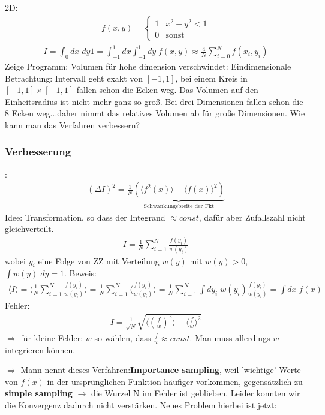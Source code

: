 \documentclass[12pt]{article}
\begin{document}
2D: %
\begin{align}
f(x,y)=
\begin{cases}
1 & x^2+y^2 <1 \\
0 & \mbox{sonst}
\end{cases}
\end{align}
\begin{align}
I= \int_0 dx \; dy 1 = \int_{-1}^1 dx \int_{-1}^1 dy \; f(x,y) 
\approx \frac{4}{N} \sum_{i=0}^N f(x_i,y_i)
\end{align}
Zeige Programm: Volumen für hohe dimension verschwindet: Eindimensionale Betrachtung: Intervall geht exakt von $[-1,1]$, bei einem Kreis in $[-1,1] \times [-1,1]$ fallen schon die Ecken weg. Das Volumen auf den Einheitsradius ist nicht mehr ganz so groß. Bei drei Dimensionen fallen schon die 8 Ecken weg...daher nimmt das relatives Volumen ab für große Dimensionen.
Wie kann man das Verfahren verbessern?

\subsubsection{Verbesserung}:
\begin{align}
(\Delta I )^2 = \frac{1}{N} \underbrace{\left( \langle f^2(x) \rangle - \langle f(x)\rangle^2 \right)}_\text{Schwankungsbreite der Fkt}
\end{align}
Idee: Transformation, so dass der Integrand $\approx const$, dafür aber Zufallszahl nicht gleichverteilt.
\begin{align}
I= \frac{1}{N} \sum_{i=1}^N \frac{f(y_i)}{w(y_i)}
\end{align}
wobei $y_i$ eine Folge von ZZ mit Verteilung $w(y)$ mit $w(y)>0$, $\int w(y) \; dy=1$.
Beweis:
\begin{align}
\langle I\rangle = \langle \frac{1}{N} \sum_{i=1}^N \frac{f(y_i)}{w(y_i)} \rangle = \frac{1}{N} \sum_{i=1}^N \langle \frac{f(y_i)}{w(y_i)} \rangle = \frac{1}{N} \sum_{i=1}^N \int dy_i \; w(y_i)  \frac{f(y_i)}{w(y_i)} 
= \int dx \; f(x)
\end{align}
Fehler: \begin{align}
I=\frac{1}{\sqrt{N}}
 \sqrt{\langle \left(\frac{f}{w}\right)^2 \rangle - \langle \frac{f}{w} \rangle ^2}
 \end{align}
 $\Rightarrow$ für kleine Felder: $w$ so wählen, dass $\frac{f}{w} \approx const.$ Man muss allerdings $w$ integrieren können. %
 
 $\Rightarrow$ Mann nennt dieses Verfahren:\textbf{Importance sampling}, weil 'wichtige' Werte von $f(x)$ in der ursprünglichen Funktion häufiger vorkommen, gegensätzlich zu \textbf{simple sampling} $\to$ die Wurzel N im Fehler ist geblieben. Leider konnten wir die Konvergenz dadurch nicht verstärken. Neues Problem hierbei ist jetzt: 
 
\end{document}
